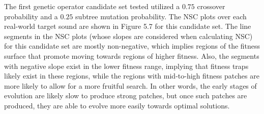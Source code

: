 \documentclass[12pt]{report} 	%
\numberwithin{figure}{chapter}
\numberwithin{table}{chapter}
\numberwithin{equation}{chapter}
\begin{document}
\begin{flushleft}
The first genetic operator candidate set tested utilized a $0.75$ crossover probability and a $0.25$ subtree mutation probability. The NSC plots over each real-world target sound are shown in Figure 5.7 for this candidate set.
The line segments in the NSC plots (whose slopes are considered when calculating NSC) for this candidate set are mostly non-negative, which implies regions of the fitness surface that promote moving towards regions of higher fitness. Also, the segments with negative slope exist in the lower fitness range, implying that fitness traps likely exist in these regions, while the regions with mid-to-high fitness patches are more likely to allow for a more fruitful search. In other words, the early stages of evolution are likely slow to produce strong patches, but once such patches are produced, they are able to evolve more easily towards optimal solutions.


\end{flushleft}
\end{document}
